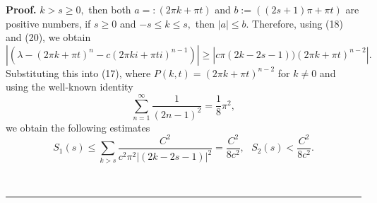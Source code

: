 \documentclass[10pt,a4paper]{amsart}
\newenvironment{proof}[1][Proof]{\textbf{#1.} }{\ \rule{0.5em}{0.5em}}
\begin{document}
\begin{proof}
$k>s\geq0,$ then both $a=:(2\pi k+\pi t)$ and $b:=((2s+1)\pi+\pi t)$ are
positive numbers, if $s\geq0$ and $-s\leq k\leq s,$ then $\left\vert
a\right\vert \leq b.$ Therefore, using (18) and (20), we obtain
\[
\left\vert \left(  \lambda-\left(  2\pi k+\pi t\right)  ^{n}-c(2\pi ki+\pi
ti)^{n-1}\right)  \right\vert \geq\left\vert c\pi(2k-2s-1))(2\pi k+\pi
t)^{n-2}\right\vert .
\]
Substituting this into (17), where $P(k,t)=\left(  2\pi k+\pi t\right)
^{n-2}$ for $k\neq0$ and using the well-known identity
\begin{equation}
\sum_{n=1}^{\infty}\frac{1}{(2n-1)^{2}}=\frac{1}{8}\pi^{2},\tag{21}%
\end{equation}
we obtain the following estimates
\begin{equation}
S_{1}(s)\leq\sum_{k>s}\frac{C^{2}}{c^{2}\pi^{2}\left\vert (2k-2s-1)\right\vert
^{2}}=\frac{C^{2}}{8c^{2}},\text{ }S_{2}(s)<\frac{C^{2}}{8c^{2}}.\tag{22}%
\end{equation}



\end{proof}
\end{document}
